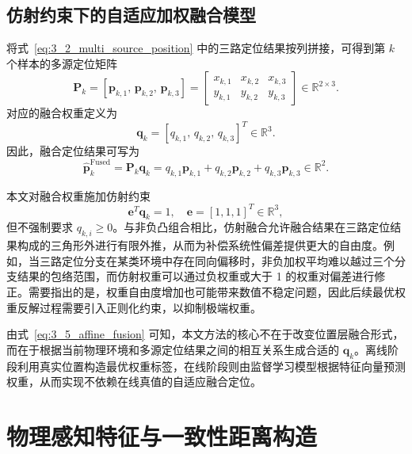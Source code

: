 \subsection{仿射约束下的自适应加权融合模型}
\label{subsec:3_1_3}

将式~\eqref{eq:3_2_multi_source_position} 中的三路定位结果按列拼接，可得到第 \(k\) 个样本的多源定位矩阵
\begin{equation}
\mathbf{P}_k
=
\left[
\mathbf{p}_{k,1},\,
\mathbf{p}_{k,2},\,
\mathbf{p}_{k,3}
\right]
=
\begin{bmatrix}
x_{k,1} & x_{k,2} & x_{k,3}\\
y_{k,1} & y_{k,2} & y_{k,3}
\end{bmatrix}
\in\mathbb{R}^{2\times3}.
\label{eq:3_3_position_matrix}
\end{equation}
对应的融合权重定义为
\begin{equation}
\mathbf{q}_k
=
\left[
q_{k,1},\,
q_{k,2},\,
q_{k,3}
\right]^T
\in\mathbb{R}^{3}.
\label{eq:3_4_weight_vector}
\end{equation}
因此，融合定位结果可写为
\begin{equation}
\hat{\mathbf{p}}_k^{\mathrm{Fused}}
=
\mathbf{P}_k\mathbf{q}_k
=
q_{k,1}\mathbf{p}_{k,1}
+
q_{k,2}\mathbf{p}_{k,2}
+
q_{k,3}\mathbf{p}_{k,3}
\in\mathbb{R}^{2}.
\label{eq:3_5_affine_fusion}
\end{equation}

本文对融合权重施加仿射约束
\begin{equation}
\mathbf{e}^T\mathbf{q}_k=1,
\quad
\mathbf{e}=[1,1,1]^T\in\mathbb{R}^{3},
\label{eq:3_6_affine_constraint}
\end{equation}
但不强制要求 \(q_{k,i}\ge0\)。与非负凸组合相比，仿射融合允许融合结果在三路定位结果构成的三角形外进行有限外推，从而为补偿系统性偏差提供更大的自由度。例如，当三路定位分支在某类环境中存在同向偏移时，非负加权平均难以越过三个分支结果的包络范围，而仿射权重可以通过负权重或大于 1 的权重对偏差进行修正。需要指出的是，权重自由度增加也可能带来数值不稳定问题，因此后续最优权重反解过程需要引入正则化约束，以抑制极端权重。

由式~\eqref{eq:3_5_affine_fusion} 可知，本文方法的核心不在于改变位置层融合形式，而在于根据当前物理环境和多源定位结果之间的相互关系生成合适的 \(\mathbf{q}_k\)。离线阶段利用真实位置构造最优权重标签，在线阶段则由监督学习模型根据特征向量预测权重，从而实现不依赖在线真值的自适应融合定位。

\section{物理感知特征与一致性距离构造}
\label{sec:3_3}

